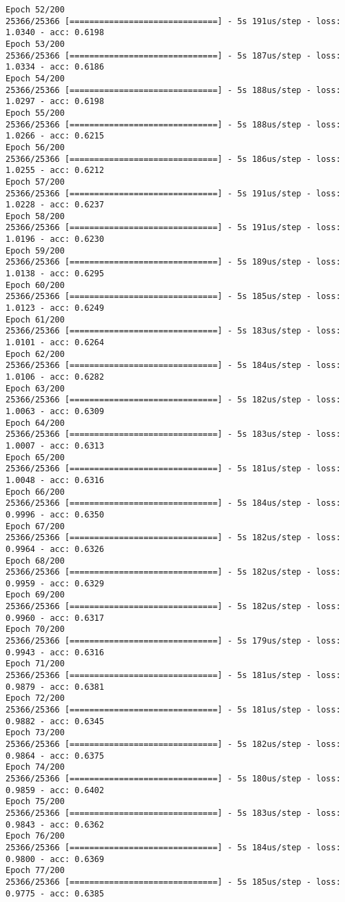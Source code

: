 \documentclass[11pt]{article}
\begin{document}
\begin{Verbatim}[commandchars=\\\{\}]
Epoch 52/200
25366/25366 [==============================] - 5s 191us/step - loss: 1.0340 - acc: 0.6198
Epoch 53/200
25366/25366 [==============================] - 5s 187us/step - loss: 1.0334 - acc: 0.6186
Epoch 54/200
25366/25366 [==============================] - 5s 188us/step - loss: 1.0297 - acc: 0.6198
Epoch 55/200
25366/25366 [==============================] - 5s 188us/step - loss: 1.0266 - acc: 0.6215
Epoch 56/200
25366/25366 [==============================] - 5s 186us/step - loss: 1.0255 - acc: 0.6212
Epoch 57/200
25366/25366 [==============================] - 5s 191us/step - loss: 1.0228 - acc: 0.6237
Epoch 58/200
25366/25366 [==============================] - 5s 191us/step - loss: 1.0196 - acc: 0.6230
Epoch 59/200
25366/25366 [==============================] - 5s 189us/step - loss: 1.0138 - acc: 0.6295
Epoch 60/200
25366/25366 [==============================] - 5s 185us/step - loss: 1.0123 - acc: 0.6249
Epoch 61/200
25366/25366 [==============================] - 5s 183us/step - loss: 1.0101 - acc: 0.6264
Epoch 62/200
25366/25366 [==============================] - 5s 184us/step - loss: 1.0106 - acc: 0.6282
Epoch 63/200
25366/25366 [==============================] - 5s 182us/step - loss: 1.0063 - acc: 0.6309
Epoch 64/200
25366/25366 [==============================] - 5s 183us/step - loss: 1.0007 - acc: 0.6313
Epoch 65/200
25366/25366 [==============================] - 5s 181us/step - loss: 1.0048 - acc: 0.6316
Epoch 66/200
25366/25366 [==============================] - 5s 184us/step - loss: 0.9996 - acc: 0.6350
Epoch 67/200
25366/25366 [==============================] - 5s 182us/step - loss: 0.9964 - acc: 0.6326
Epoch 68/200
25366/25366 [==============================] - 5s 182us/step - loss: 0.9959 - acc: 0.6329
Epoch 69/200
25366/25366 [==============================] - 5s 182us/step - loss: 0.9960 - acc: 0.6317
Epoch 70/200
25366/25366 [==============================] - 5s 179us/step - loss: 0.9943 - acc: 0.6316
Epoch 71/200
25366/25366 [==============================] - 5s 181us/step - loss: 0.9879 - acc: 0.6381
Epoch 72/200
25366/25366 [==============================] - 5s 181us/step - loss: 0.9882 - acc: 0.6345
Epoch 73/200
25366/25366 [==============================] - 5s 182us/step - loss: 0.9864 - acc: 0.6375
Epoch 74/200
25366/25366 [==============================] - 5s 180us/step - loss: 0.9859 - acc: 0.6402
Epoch 75/200
25366/25366 [==============================] - 5s 183us/step - loss: 0.9843 - acc: 0.6362
Epoch 76/200
25366/25366 [==============================] - 5s 184us/step - loss: 0.9800 - acc: 0.6369
Epoch 77/200
25366/25366 [==============================] - 5s 185us/step - loss: 0.9775 - acc: 0.6385

\end{Verbatim}
\end{document}
